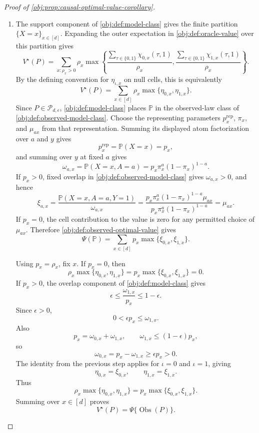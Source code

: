 \documentclass[11pt]{article}
\begin{document}
\begin{proof}[Proof of \cref{obj:prop:causal-optimal-value-corollary}]
\begin{enumerate}
\item The support component of \cref{obj:def:model-class} gives the finite partition \(\{X=x\}_{x\in[d]}\). Expanding the outer expectation in \cref{obj:def:oracle-value} over this partition gives
\[
V^\star(P)
=
\sum_{x:\rho_x>0}\rho_x
\max\left\{
\frac{\sum_{\tau\in\{0,1\}}\chi_{0,x}(\tau,1)}{\rho_x},
\frac{\sum_{\tau\in\{0,1\}}\chi_{1,x}(\tau,1)}{\rho_x}
\right\}.
\]
By the defining convention for \(\eta_{\iota,x}\) on null cells, this is equivalently
\[
V^\star(P)
=
\sum_{x\in[d]}\rho_x\max\{\eta_{0,x},\eta_{1,x}\}.
\]
Since \(P\in\mathcal P_{d,\epsilon}\), \cref{obj:def:model-class} places \(\mathbb P\) in the observed-law class of \cref{obj:def:observed-model-class}. Choose the representing parameters \(p_x^{\mathrm{rep}}\), \(\pi_x\), and \(\mu_{ax}\) from that representation. Summing its displayed atom factorization over \(a\) and \(y\) gives
\[
p_x^{\mathrm{rep}}=\mathbb P(X=x)=p_x,
\]
and summing over \(y\) at fixed \(a\) gives
\[
\omega_{a,x}
=
\mathbb P(X=x,A=a)
=
p_x\pi_x^a(1-\pi_x)^{1-a}.
\]
If \(p_x>0\), fixed overlap in \cref{obj:def:observed-model-class} gives \(\omega_{a,x}>0\), and hence
\[
\xi_{a,x}
=
\frac{\mathbb P(X=x,A=a,Y=1)}{\omega_{a,x}}
=
\frac{p_x\pi_x^a(1-\pi_x)^{1-a}\mu_{ax}}
{p_x\pi_x^a(1-\pi_x)^{1-a}}
=
\mu_{ax}.
\]
If \(p_x=0\), the cell contribution to the value is zero for any permitted choice of \(\mu_{ax}\). Therefore \cref{obj:def:observed-optimal-value} gives
\[
\Psi(\mathbb P)
=
\sum_{x\in[d]}p_x\max\{\xi_{0,x},\xi_{1,x}\}.
\]

Using \(p_x=\rho_x\), fix \(x\).  If \(p_x=0\), then
\[
\rho_x\max\{\eta_{0,x},\eta_{1,x}\}
=
p_x\max\{\xi_{0,x},\xi_{1,x}\}
=
0.
\]
If \(p_x>0\), the overlap component of \cref{obj:def:model-class} gives
\[
\epsilon\le \frac{\omega_{1,x}}{p_x}\le 1-\epsilon .
\]
Since \(\epsilon>0\),
\[
0<\epsilon p_x\le \omega_{1,x}.
\]
Also
\[
p_x=\omega_{0,x}+\omega_{1,x},
\qquad
\omega_{1,x}\le (1-\epsilon)p_x,
\]
so
\[
\omega_{0,x}=p_x-\omega_{1,x}\ge \epsilon p_x>0.
\]
The identity from the previous step applies for \(\iota=0\) and \(\iota=1\), giving
\[
\eta_{0,x}=\xi_{0,x},
\qquad
\eta_{1,x}=\xi_{1,x}.
\]
Thus
\[
\rho_x\max\{\eta_{0,x},\eta_{1,x}\}
=
p_x\max\{\xi_{0,x},\xi_{1,x}\}.
\]
Summing over \(x\in[d]\) proves
\[
V^\star(P)=\Psi\{\operatorname{Obs}(P)\}.
\]
\end{enumerate}
\end{proof}
\end{document}
